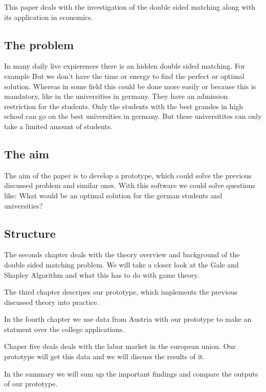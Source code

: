 This paper deals with the investigation of the double sided matching along with its application in economics. 

\subsection{The problem}
In many daily live expierences there is an hidden double sided matching.
For example
But we don't have the time or energy to find the perfect or optimal solution.
Whereas in some field this could be done more easily or because this is mandatory, like in the universities in germany.
They have an admission restriction for the students.
Only the students with the best grandes in high school can go on the best universities in germany.
But these universitites can only take a limited amount of students.


\subsection{The aim}
The aim of the paper is to develop a prototype, which could solve the previous discussed problem and similar ones.
With this software we could solve questions like:
What would be an optimal solution for the german students and universities?

\subsection{Structure}

The seconds chapter deals with the theory overview and background of the double sided matching problem.
We will take a closer look at the Gale and Shapley Algorithm and what this has to do with game theory.

The third chapter descripes our prototype, which implements the previous discussed theory into practice.

In the fourth chapter we use data from Austria with our prototype to make an statment over the college applications.

Chaper five deals deals with the labor market in the european union. Our prototype will get this data and we will discuss the results of it.

In the summary we will sum up the important findings and compare the outputs of our prototype.

